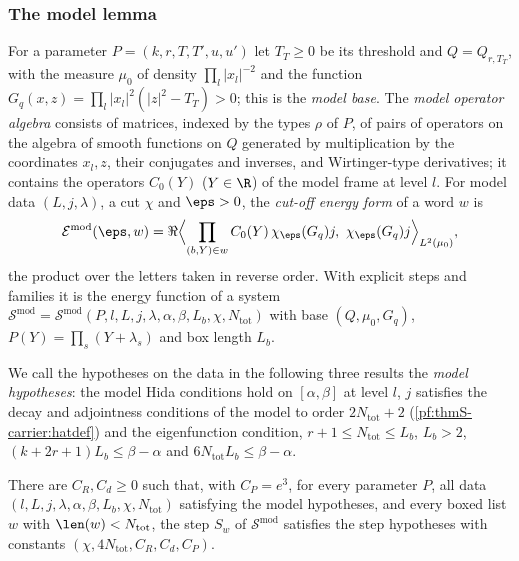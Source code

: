 \subsubsection{The model lemma}
\begin{definition}\label{pf:thmS-carrier:modelsys}
For a parameter $P=(k,r,T,T',u,u')$ let $T_T\ge0$ be its threshold and $Q=Q_{r,T_T}$, with the measure $\mu_0$ of density
$\prod_l|x_l|^{-2}$ and the function $G_q(x,z)=\prod_l|x_l|^2(|z|^2-T_T)>0$; this is the \emph{model base}. The \emph{model
operator algebra} consists of matrices, indexed by the types $\rho$ of $P$, of pairs of operators on the algebra of smooth
functions on $Q$ generated by multiplication by the coordinates $x_l,z$, their conjugates and inverses, and Wirtinger-type
derivatives; it contains the operators $C_0(Y)$ ($Y\in\R$) of the model frame at level $l$. For model data $(L,j,\lambda)$, a
cut $\chi$ and $\eps>0$, the \emph{cut-off energy form} of a word $w$ is
\[
\thmScarrierEn^{\mathrm{mod}}(\eps,w)=\Re\Bigl\langle\prod_{(b,Y)\in w}C_0(Y)\,\chi_\eps(G_q)j,\ \chi_\eps(G_q)j
\Bigr\rangle_{L^2(\mu_0)},
\]
the product over the letters taken in reverse order. With explicit steps and families it is the energy function of a system
$\mathcal S^{\mathrm{mod}}=\mathcal S^{\mathrm{mod}}(P,l,L,j,\lambda,\alpha,\beta,L_b,\chi,N_{\mathrm{tot}})$ with base
$(Q,\mu_0,G_q)$, $P(Y)=\prod_s(Y+\lambda_s)$ and box length $L_b$.
\end{definition}

We call the hypotheses on the data in the following three results the \emph{model hypotheses}: the model Hida conditions hold
on $[\alpha,\beta]$ at level $l$, $j$ satisfies the decay and adjointness conditions of the model to order $2N_{\mathrm{tot}}+2$
(\cref{pf:thmS-carrier:hatdef}) and the eigenfunction condition, $r+1\le N_{\mathrm{tot}}\le L_b$, $L_b>2$,
$(k+2r+1)L_b\le\beta-\alpha$ and $6N_{\mathrm{tot}}L_b\le\beta-\alpha$.

\begin{theorem}\label{pf:thmS-carrier:stepimports}
There are $C_R,C_d\ge0$ such that, with $C_P=e^3$, for every parameter $P$, all data $(l,L,j,\lambda,\alpha,\beta,L_b,\chi,
N_{\mathrm{tot}})$ satisfying the model hypotheses, and every boxed list $w$ with $\len(w)<N_{\mathrm{tot}}$, the step $S_w$ of
$\mathcal S^{\mathrm{mod}}$ satisfies the step hypotheses with constants $(\chi,4N_{\mathrm{tot}},C_R,C_d,C_P)$.
\end{theorem}

